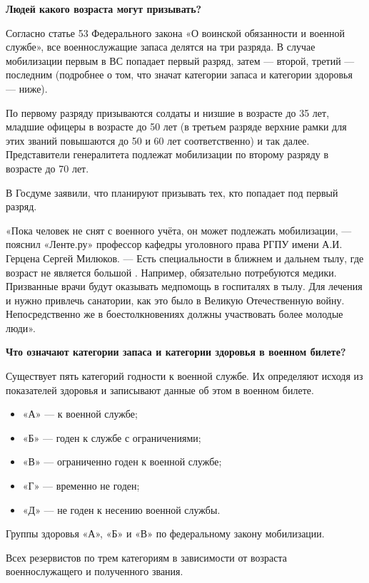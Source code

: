 \textbf{Людей какого возраста могут призывать?}

Согласно статье 53 Федерального закона «О воинской обязанности и военной службе», все военнослужащие запаса делятся на три разряда. В случае мобилизации первым в ВС попадает первый разряд, затем — второй, третий — последним (подробнее о том, что значат категории запаса и категории здоровья — ниже).

По первому разряду призываются солдаты и низшие  в возрасте до 35 лет, младшие офицеры в возрасте до 50 лет (в третьем разряде верхние рамки для этих званий повышаются до 50 и 60 лет соответственно) и так далее. Представители генералитета подлежат мобилизации по второму разряду в возрасте до 70 лет.

В Госдуме заявили, что планируют призывать тех, кто попадает под первый разряд.

«Пока человек не снят с военного учёта, он может подлежать мобилизации, — пояснил «Ленте.ру» профессор кафедры уголовного права РГПУ имени А.И. Герцена Сергей Милюков. — Есть специальности в ближнем и дальнем тылу, где возраст не является большой . Например, обязательно потребуются медики. Призванные врачи будут оказывать медпомощь в госпиталях в тылу. Для лечения и  нужно привлечь санатории, как это было в Великую Отечественную войну. Непосредственно же в боестолкновениях должны участвовать более молодые люди».

\textbf{Что означают категории запаса и категории здоровья в военном билете? }

Существует пять категорий годности к военной службе. Их определяют исходя из показателей здоровья и записывают данные об этом в военном билете.
\begin{itemize}
    \item «А» —  к военной службе;
    \item «Б» — годен к службе с  ограничениями;
    \item «В» — ограниченно годен к военной службе;
    \item «Г» — временно не годен;
    \item «Д» — не годен к несению военной службы.
\end{itemize}
Группы здоровья «А», «Б» и «В» по федеральному закону  мобилизации.

Всех резервистов  по трем категориям в зависимости от возраста военнослужащего и полученного звания.

